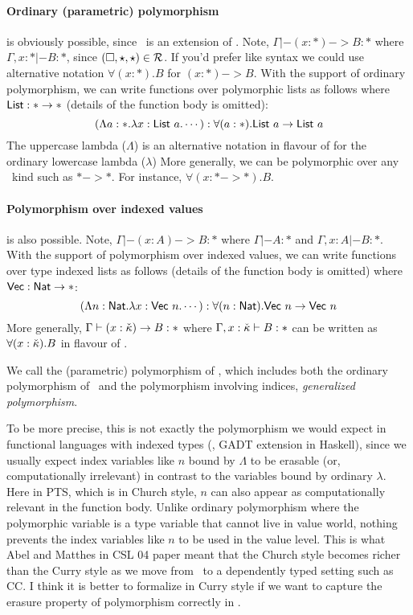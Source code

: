 \paragraph{Ordinary (parametric) polymorphism} is obviously possible,
since \Fi\ is an extension of \Fw. Note, $\Gamma |- (x:*) -> B : *$
where $\Gamma,x:* |- B:*$, since $(\square,\star,\star) \in\mathcal{R}$.
If you'd prefer \Fw\-like syntax we could use alternative notation
$\forall(x:*).B$ for $(x:*) -> B$. With the support of ordinary polymorphism,
we can write functions over polymorphic lists as follows
where $\mathsf{List} : * -> *$ (details of the function body is omitted):
\[ (\Lambda a:*.\lambda x:\mathsf{List}~a. \cdots) : \forall(a:*).\mathsf{List}~a -> \mathsf{List}~a \]
The uppercase lambda ($\Lambda$) is an alternative notation in flavour of \Fw
for the ordinary lowercase lambda ($\lambda$)
More generally, we can be polymorphic over any \Fw\ kind such as $* -> *$.
For instance, $\forall(x:* -> *).B$.

\paragraph{Polymorphism over indexed values} is also possible.
Note, $\Gamma |- (x:A) -> B : *$ where $\Gamma |- A:*$ and $\Gamma,x:A |- B:*$.
With the support of polymorphism over indexed values, we can write functions
over type indexed lists as follows (details of the function body is omitted)
where $\mathsf{Vec} : \mathsf{Nat} -> *$:
\[
(\Lambda n:\mathsf{Nat}.\lambda x:\mathsf{Vec}~n. \cdots) : \forall(n:\mathsf{Nat}).\mathsf{Vec}~n -> \mathsf{Vec}~n 
\]
More generally, $\Gamma |- (x:{\check\kappa}) -> B : *$ where $\Gamma, x:{\check\kappa} |- B:*$
can be written as $\forall(x:{\check\kappa}).B$ in flavour of \Fw.

We call the (parametric) polymorphism of \Fi, which includes
both the ordinary polymorphism of \Fw\ and the polymorphism involving indices,
\emph{generalized polymorphism}.

To be more precise, this is not exactly the polymorphism we would expect
in functional languages with indexed types (\eg, GADT extension in Haskell),
since we usually expect index variables like $n$ bound by $\Lambda$ to be
erasable (or, computationally irrelevant) in contrast to the variables bound
by ordinary $\lambda$. Here in PTS, which is in Church style, $n$ can also
appear as computationally relevant in the function body. Unlike ordinary
polymorphism where the polymorphic variable is a type variable that cannot
live in value world, nothing prevents the index variables like $n$ to be used
in the value level. This is what Abel and Matthes in CSL 04 paper meant that
the Church style becomes richer than the Curry style as we move from \Fw\ to
a dependently typed setting such as CC. I think it is better to formalize
in Curry style if we want to capture the erasure property of polymorphism
correctly in \Fi.

